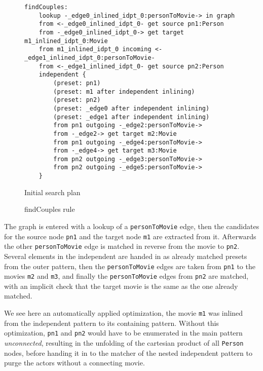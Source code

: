 \begin{figure}[h]
	\begin{verbatim}
findCouples:
    lookup -_edge0_inlined_idpt_0:personToMovie-> in graph
    from <-_edge0_inlined_idpt_0- get source pn1:Person
    from -_edge0_inlined_idpt_0-> get target m1_inlined_idpt_0:Movie
    from m1_inlined_idpt_0 incoming <-_edge1_inlined_idpt_0:personToMovie-
    from <-_edge1_inlined_idpt_0- get source pn2:Person
    independent {
        (preset: pn1)
        (preset: m1 after independent inlining)
        (preset: pn2)
        (preset: _edge0 after independent inlining)
        (preset: _edge1 after independent inlining)
        from pn1 outgoing -_edge2:personToMovie->
        from -_edge2-> get target m2:Movie
        from pn1 outgoing -_edge4:personToMovie->
        from -_edge4-> get target m3:Movie
        from pn2 outgoing -_edge3:personToMovie->
        from pn2 outgoing -_edge5:personToMovie->
    }
\end{verbatim}
	\caption{Initial search plan}
	\label{fig:InitialSP}
\end{figure}

\begin{figure}[h]
	
	\caption{findCouples rule}
	\label{fig:findCouples.grg}
\end{figure}

The graph is entered with a lookup of a \texttt{personToMovie} edge, then the candidates for the source node \texttt{pn1} and the target node \texttt{m1} are extracted from it. Afterwards the other \texttt{personToMovie} edge is matched in reverse from the movie to \texttt{pn2}.
Several elements in the independent are handed in as already matched presets from the outer pattern, then the \texttt{personToMovie} edges are taken from \texttt{pn1} to the movies \texttt{m2} and \texttt{m3}, and finally the \texttt{personToMovie} edges from \texttt{pn2} are matched, with an implicit check that the target movie is the same as the one already matched.

We see here an automatically applied optimization, the movie \texttt{m1} was inlined from the independent pattern to its containing pattern. Without this optimization, \texttt{pn1} and \texttt{pn2} would have to be enumerated in the main pattern \emph{unconnected}, resulting in the unfolding of the cartesian product of all \texttt{Person} nodes, before handing it in to the matcher of the nested independent pattern to purge the actors without a connecting movie.


